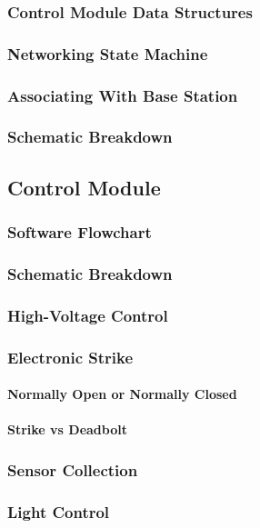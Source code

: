 \subsubsection{Control Module Data Structures}

\subsubsection{Networking State Machine}

\subsubsection{Associating With Base Station}

\subsubsection{Schematic Breakdown}

\subsection{Control Module}

\subsubsection{Software Flowchart}

\subsubsection{Schematic Breakdown}

\subsubsection{High-Voltage Control}

\subsubsection{Electronic Strike}
\label{sec:electronic-strike}

\paragraph{Normally Open or Normally Closed}

\paragraph{Strike vs Deadbolt}

\subsubsection{Sensor Collection}

\subsubsection{Light Control}

